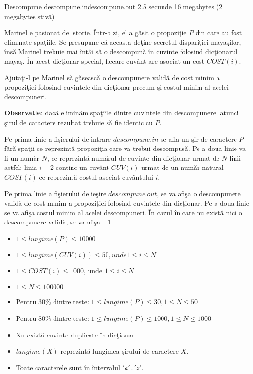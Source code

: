 \begin{problem}{Descompune}
{descompune.in}{descompune.out}
{2.5 secunde} {16 megabytes (2 megabytes stiv\u{a})}{}

Marinel e pasionat de istorie. \^{I}ntr-o zi, el a g\u{a}sit o propozi\c{t}ie $P$ din care au fost eliminate spa\c{t}iile. Se presupune c\u{a} aceasta de\c{t}ine secretul dispari\c{t}iei maya\c{s}ilor, \^{i}ns\u{a} Marinel trebuie mai \^{i}nt\^{a}i s\u{a} o descompun\u{a} \^{i}n cuvinte folosind dic\c{t}ionarul maya\c{s}. \^{I}n acest dic\c{t}ionar special, fiecare cuv\^{a}nt are asociat un cost $COST(i)$.

Ajuta\c{t}i-l pe Marinel s\u{a} g\u{a}seasc\u{a} o descompunere valid\u{a} de cost minim a propozi\c{t}iei folosind cuvintele din dic\c{t}ionar precum \c{s}i costul minim al acelei descompuneri. 

\textbf{Observatie}: dac\u{a} elimin\u{a}m spa\c{t}iile dintre cuvintele din descompunere, atunci \c{s}irul de caractere rezultat trebuie s\u{a} fie identic cu $P$.


\InputFile

Pe prima linie a fi\c{s}ierului de intrare $descompune.in$ se afla un \c{s}ir de caractere $P$ f\u{a}r\u{a} spa\c{t}ii ce reprezint\u{a} propozi\c{t}ia care va trebui descompus\u{a}. Pe a doua linie va fi un num\u{a}r $N$, ce reprezint\u{a} num\u{a}rul de cuvinte din dic\c{t}ionar urmat de $N$ linii astfel: linia $i + 2$ contine un cuv\^{a}nt $CUV(i)$ urmat de un num\u{a}r natural $COST(i)$ ce reprezint\u{a} costul asociat cuv\^{a}ntului $i$.

\OutputFile

Pe prima linie a fi\c{s}ierului de ie\c{s}ire $descompune.out$, se va afi\c{s}a o descompunere valid\u{a} de cost minim a propozi\c{t}iei folosind cuvintele din dic\c{t}ionar.
Pe a doua linie se va afi\c{s}a costul minim al acelei descompuneri.
\^{I}n cazul \^{i}n care nu exist\u{a} nici o descompunere valid\u{a}, se va afi\c{s}a $-1$.

\Constraints
\begin{itemize}
	\setlength{\itemsep}{1pt}
  	\setlength{\parskip}{0pt}
  	\setlength{\parsep}{0pt}
 	\item $1 \le lungime(P) \le 10 000$
	\item $1 \le lungime(CUV(i)) \le 50, unde 1 \le i \le N$
	\item $1 \le COST(i) \le 1000$, unde $1 \le i \le N$
	\item $1 \le N \le 100 000$
	\item Pentru $30 \%$ dintre teste: $1 \le lungime(P) \le 30, 1 \le N \le 50$
	\item Pentru $80 \%$ dintre teste: $1 \le lungime(P) \le 1000, 1 \le N \le 1000$
	\item Nu exist\u{a} cuvinte duplicate \^{i}n dic\c{t}ionar.
	\item $lungime(X)$ reprezint\u{a} lungimea \c{s}irului de caractere $X$.
	\item Toate caracterele sunt \^{i}n \^{i}ntervalul $'a'..'z'$.
\end{itemize}



\end{problem}
